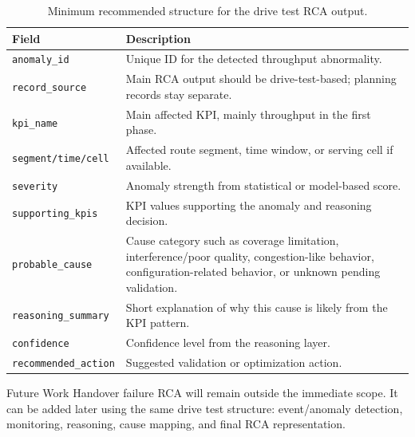 \documentclass[12pt,a4paper]{article}
\newcommand{\colname}[1]{\texttt{#1}}
\begin{document}
\begin{table}[H]
\centering
\scriptsize
\begin{tabularx}{\textwidth}{P{3.35cm}Y}
\toprule
\textbf{Field} & \textbf{Description} \\
\midrule
\colname{anomaly\_id} & Unique ID for the detected throughput abnormality. \\
\colname{record\_source} & Main RCA output should be drive-test-based; planning records stay separate. \\
\colname{kpi\_name} & Main affected KPI, mainly throughput in the first phase. \\
\colname{segment/time/cell} & Affected route segment, time window, or serving cell if available. \\
\colname{severity} & Anomaly strength from statistical or model-based score. \\
\colname{supporting\_kpis} & KPI values supporting the anomaly and reasoning decision. \\
\colname{probable\_cause} & Cause category such as coverage limitation, interference/poor quality, congestion-like behavior, configuration-related behavior, or unknown pending validation. \\
\colname{reasoning\_summary} & Short explanation of why this cause is likely from the KPI pattern. \\
\colname{confidence} & Confidence level from the reasoning layer. \\
\colname{recommended\_action} & Suggested validation or optimization action. \\
\bottomrule
\end{tabularx}
\caption{Minimum recommended structure for the drive test RCA output.}
\end{table}

\begin{warningbox}{Future Work}
Handover failure RCA will remain outside the immediate scope. It can be added later using the same drive test structure: event/anomaly detection, monitoring, reasoning, cause mapping, and final RCA representation.
\end{warningbox}
\end{document}
